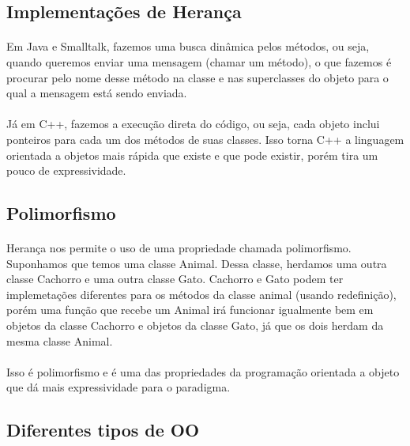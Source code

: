 \documentclass[11pt]{article}
\begin{document}
\subsection{Implementações de Herança}
\label{sec:org8925735}
\paragraph{} Em Java e Smalltalk, fazemos uma busca dinâmica pelos métodos, ou seja, quando queremos enviar uma mensagem (chamar um
método), o que fazemos é procurar pelo nome desse método na classe e nas superclasses do objeto para o qual a mensagem está sendo enviada.

\paragraph{} Já em C++, fazemos a execução direta do código, ou seja, cada objeto inclui ponteiros para cada um dos métodos de suas
classes. Isso torna C++ a linguagem orientada a objetos mais rápida que existe e que pode existir, porém tira um pouco de expressividade.

\subsection{Polimorfismo}
\label{sec:org9a7d48c}
\paragraph{} Herança nos permite o uso de uma propriedade chamada polimorfismo. Suponhamos que temos uma classe Animal. Dessa classe,
herdamos uma outra classe Cachorro e uma outra classe Gato. Cachorro e Gato podem ter implemetações diferentes para os métodos da classe
animal (usando redefinição), porém uma função que recebe um Animal irá funcionar igualmente bem em objetos da classe Cachorro e objetos da
classe Gato, já que os dois herdam da mesma classe Animal.

\paragraph{} Isso é polimorfismo e é uma das propriedades da programação orientada a objeto que dá mais expressividade para o paradigma.

\subsection{Diferentes tipos de OO}
\label{sec:org9e0b5be}
\end{document}
